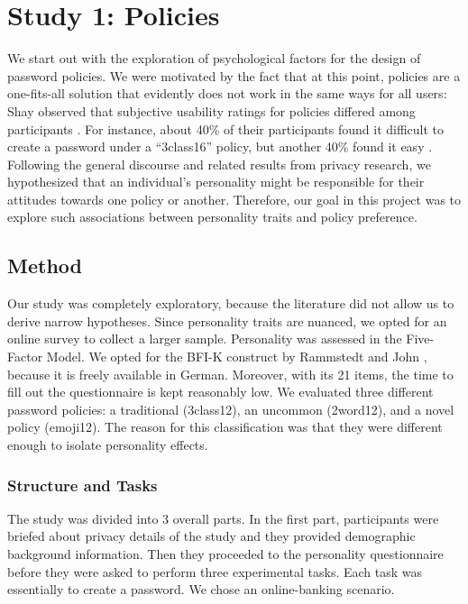 \section{Study 1: Policies}
We start out with the exploration of psychological factors for the design of password policies. We were motivated by the fact that at this point, policies are a one-fits-all solution that evidently does not work in the same ways for all users: Shay \etal observed that subjective usability ratings for policies differed among participants \cite{Shay2012CorrectHorseBatteryStaple, Shay2014CanLongPasswordsBeSecureAndUsable}. For instance, about 40\% of their participants found it difficult to create a password under a ``3class16'' policy, but another 40\% found it easy \cite{Shay2014CanLongPasswordsBeSecureAndUsable}. Following the general discourse and related results from privacy research, we hypothesized that an individual's personality might be responsible for their attitudes towards one policy or another. Therefore, our goal in this project was to explore such associations between personality traits and policy preference. 
\subsection{Method}
Our study was completely exploratory, because the literature did not allow us to derive narrow hypotheses. Since personality traits are nuanced, we opted for an online survey to collect a larger sample. Personality was assessed in the Five-Factor Model. We opted for the BFI-K construct by Rammstedt and John \cite{Rammstedt2005BFI}, because it is freely available in German. Moreover, with its 21 items, the time to fill out the questionnaire is kept reasonably low. 
We evaluated three different password policies: a traditional (3class12), an uncommon (2word12), and a novel policy (emoji12). The reason for this classification was that they were different enough to isolate personality effects. 

\subsubsection{Structure and Tasks}
The study was divided into 3 overall parts. In the first part, participants were briefed about privacy details of the study and they provided demographic background information. Then they proceeded to the personality questionnaire before they were asked to perform three experimental tasks. Each task was essentially to create a password. We chose an online-banking scenario. 

